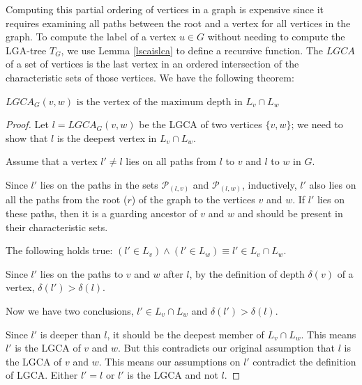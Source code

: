 Computing this partial ordering of vertices in a graph is expensive since it requires examining all paths between the root and a vertex for all vertices in the graph. To compute the label of a vertex $u \in G$ without needing to compute the LGA-tree $T_G$, we use Lemma \ref{lscaislca} to define a recursive function. 
The $LGCA$ of a set of vertices is the last vertex in an ordered intersection of the characteristic sets of those vertices. We have the following theorem:

\begin{theorem} \label{proofOfDeepness}
	$\mathit{LGCA}_G(v,w) \text{ is the vertex of the maximum depth in } L_v\cap L_w$
\end{theorem}

\begin{proof}
	 Let $l = LGCA_G(v,w)$ be the LGCA of two vertices $\{v, w\}$; we need to show that $l$ is the deepest vertex in  $L_v \cap L_w$.

	Assume that a vertex $l' \neq l$ lies on all paths from $l$ to $v$ and $l$ to $w$ in $G$.

	Since $l'$ lies on the paths in the sets $\mathcal{P}_{(l,v)}$ and $\mathcal{P}_{(l,w)}$, inductively, $l'$ also lies on all the paths from the root ($r$) of the graph to the vertices $v$ and $w$.
	If  $l'$ lies on these paths, then it is a guarding ancestor of $v$ and $w$ and should be present in their characteristic sets.
	
	The following holds true: $(l' \in L_v) \land (l' \in L_w) \equiv l' \in L_v \cap L_w$.

	Since $l'$ lies on the paths to $v$ and $w$ after $l$, by the definition of depth $\delta(v)$ of a vertex,	$\delta(l') > \delta(l)$.

	Now we have two conclusions, $l' \in L_v \cap L_w$ and $\delta(l') > \delta(l)$.

	Since $l'$ is deeper than $l$, it should be the deepest member of  $ L_v \cap L_w$.
	This means $l'$ is the LGCA of $v$ and $w$.
	But this contradicts our original assumption that $l$ is the LGCA of $v$ and $w$.
	This means our assumptions on $l'$ contradict the definition of LGCA. Either $l'=l$ or $l'$ is the LGCA and not $l$.
\end{proof}



